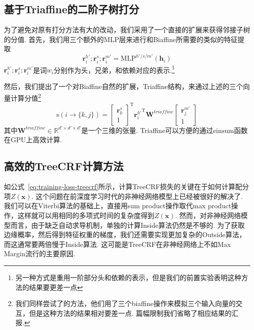 \subsection{基于Triaffine的二阶子树打分}
为了避免对原有打分方法有大的改动，我们采用了一个直接的扩展来获得邻接子树的分值.
首先，我们用三个额外的MLP层来进行和Biaffine所需要的类似的特征提取
\begin{equation}
  \label{mlp-sib}
  \mathbf{r}_i^{h'}; \mathbf{r}_i^{s}; \mathbf{r}_i^{m'} =\mathrm{MLP}^{h'/s/m'} \left( \mathbf{h}_i \right)
\end{equation}
$\mathbf{r}_i^{h'}; \mathbf{r}_i^{s}; \mathbf{r}_i^{m'}$是词$w_i$分别作为头，兄弟，和依赖对应的表示.\footnote{
  另一种方式是重用一阶部分头和依赖的表示，但是我们的前置实验表明这种方法的结果要更差一点
}

然后，我们提出了一个对Biaffine自然的扩展，Triaffine结构，来通过上述的三个向量计算分值\footnote{
  我们同样尝试了\citet{wang-etal-2019-second}的方法，他们用了三个biaffine操作来模拟三个输入向量的交互，但是这种方法的结果相对要差一点.
  篇幅限制我们省略了相应结果的汇报.
}
\begin{equation} \label{eq:triaffine}
  \mathrm{s}(i\rightarrow \{k,j\}) =
  \left[
    \begin{array}{c}
      \mathbf{r}_{k}^{s} \\
      1
    \end{array}
    \right]^\mathrm{T}
  {\mathbf{r}_{i}^{h'}}^\mathrm{T}
  \mathbf{W}^\textit{triaffine}
  \left[
    \begin{array}{c}
      \mathbf{r}_{j}^{m'} \\
      1
    \end{array}
    \right]
\end{equation}
其中$\mathbf{W}^\textit{triaffine} \in \mathbb{R}^{d' \times d' \times d'}$是一个三维的张量.
Triaffine可以方便的通过$\mathrm{einsum}$函数在GPU上高效计算.

\subsection{高效的TreeCRF计算方法}

如公式~\ref{eq:training-loss-treecrf}所示，计算TreeCRF损失的关键在于如何计算配分项$Z(\boldsymbol{x})$.
这个问题在前深度学习时代的非神经网络模型上已经被很好的解决了.
我们可以在Viterbi算法的基础上，直接用sum product操作取代max product操作，这样就可以用相同的多项式时间的复杂度得到$Z(\boldsymbol{x})$.
然而，对非神经网络模型而言，由于缺乏自动求导机制，单独的计算Inside算法仍然是不够的.
为了获取边缘概率，然后得到特征权重的梯度，我们还需要实现更加复杂的Outside算法，而这通常要两倍慢于Inside算法.
这可能是TreeCRF在非神经网络上不如Max Margin流行的主要原因.

